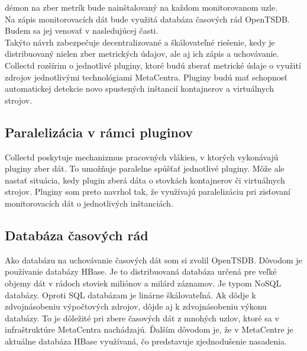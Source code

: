 \documentclass[12pt,twoside,color,cover,table]{fithesis3}
\begin{document}
démon na zber metrík bude nainštalovaný na každom monitorovanom uzle.
\\Na zápis monitorovacích dát bude využitá databáza časových rád OpenTSDB. Budem sa jej venovať v nasledujúcej časti.
\\Takýto návrh zabezpečuje decentralizované a škálovateľné riešenie, kedy je distribuovaný nielen zber metrických údajov, ale aj ich zápis a uchovávanie.
\\Collectd rozšírim o jednotlivé pluginy, ktoré budú zberať metrické údaje o využití zdrojov jednotlivými technológiami MetaCentra. Pluginy budú 
mať schopnosť automatickej detekcie novo spustených inštancií kontajnerov a virtuálnych strojov.

\subsection{Paralelizácia v rámci pluginov}
Collectd poskytuje mechanizmus pracovných vlákien, v ktorých vykonávajú pluginy zber dát. To umožňuje paralelne spúšťať jednotlivé pluginy.
Môže ale nastať situácia, kedy plugin zberá dáta o stovkách kontajnerov či virtuálnych strojov. Pluginy som preto navrhol tak, že využívajú
paralelizáciu pri zisťovaní monitorovacích dát o jednotlivých inštanciách. 

\subsection{Databáza časových rád}
Ako databázu na uchovávanie časových dát som si zvolil OpenTSDB. Dôvodom je používanie databázy HBase. Je to distribuovaná databáza určená pre veľké objemy dát v rádoch stoviek miliónov a milárd záznamov. 
Je typom NoSQL databázy. Oproti SQL databázam je linárne škálovateľná. Ak dôdje k zdvojnásobeniu výpočtových zdrojov, dôjde aj k zdvojnásobeniu výkonu databázy. To je dôležité pri zbere časových dát z mnohých
uzlov, ktoré sa v infraštruktúre MetaCentra nachádzajú. Ďalším dôvodom je, že v MetaCentre je aktuálne databáza HBase využívaná, čo predstavuje zjednodušenie nasadenia. 
\end{document}
